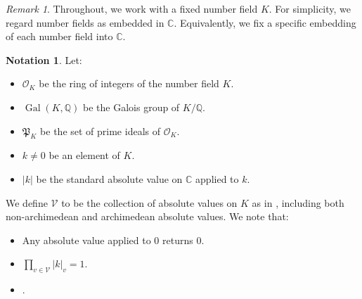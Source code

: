 \documentclass[reqno]{amsart}
\theoremstyle{plain}
\theoremstyle{definition}
\newtheorem{Notation}[Cor]{Notation}
\theoremstyle{remark}
\newtheorem{Rem}[Cor]{Remark}
\theoremstyle{plain}
\begin{document}
\begin{Rem}
Throughout, we work with a fixed number field $K$. For simplicity, we regard number fields as embedded in $\mathbb C$. Equivalently, we fix a specific embedding of each number field into $\mathbb C$.
\end{Rem}

\begin{Notation}
Let:
\begin{itemize}
    \item $\mathcal O_ K$ be the ring of integers of the number field $K$.
    \item $\operatorname{Gal}(K,\mathbb Q)$ be the Galois group of $K/\mathbb Q$.
    \item $\mathfrak P_{ K}$ be the set of prime ideals of $\mathcal O_ K$.
    \item $k\neq 0$ be an element of $K$.
    \item $|k|$ be the standard absolute value on $\mathbb C$ applied to $k$.
\end{itemize}

We define $\mathcal V$ to be the collection of absolute values on $K$ as in \cite[Chapter 3, \S4, Algebraic fundamentals]{NesterenkoPhilippon2001IntroductionToAlgebraicIndependenceTheory}, including both non-archimedean and archimedean absolute values. We note that:
\begin{itemize}
    \item Any absolute value applied to $0$ returns $0$.
    \item $\prod_{v\in\mathcal V}|k|_v=1$.
    \item {}.
\end{itemize}
\end{Notation}
\end{document}
